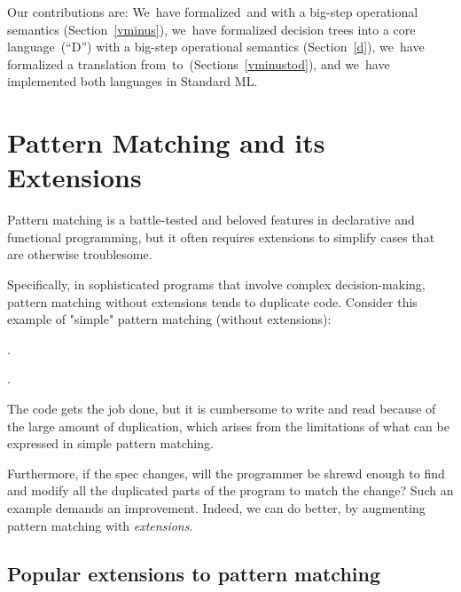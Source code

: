 \documentclass[article,screen,12pt, nonacm]{acmart}
\begin{document}

Our contributions are: 
We~have formalized~\PPlus and \VMinus with a big-step operational semantics
(Section~\ref{vminus}), we~have formalized decision trees into a core
language~\D (“D”) with a big-step operational semantics (Section~\ref{d}), 
we~have formalized a translation from~\VMinus to~\D (Sections~\ref{vminustod}),
and we~have implemented both languages in Standard ML. 



\section{Pattern Matching and its Extensions}
\label{pmandextensions}
    \textbf{}


    Pattern matching is a battle-tested and beloved features in declarative and
    functional programming, but it often requires extensions to simplify cases
    that are otherwise troublesome. 
    
    
    Specifically, in sophisticated programs that involve complex
    decision-making, pattern matching without extensions tends to duplicate
    code. Consider this example of "simple" pattern matching (without
    extensions): 

    .

    . 

    The code gets the job done, but it is cumbersome to write and read because
    of the large amount of duplication, which arises from the limitations of
    what can be expressed in simple pattern matching. 
    
    Furthermore, if the spec changes, will the programmer be shrewd enough to
    find and modify all the duplicated parts of the program to match the change?
    Such an example demands an improvement. Indeed, we can do better, by 
    augmenting pattern matching with \textit{extensions}. 


    \subsection{Popular extensions to pattern matching}
    \label{extensions}
\end{document}
